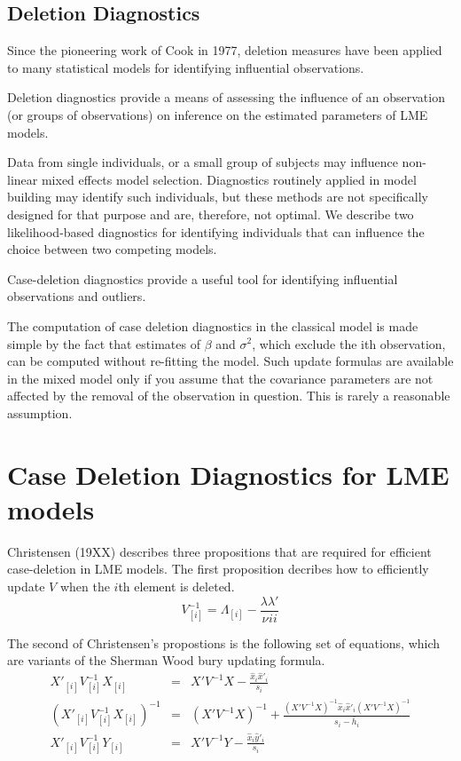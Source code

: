 \documentclass[MAIN.tex]{subfiles}
\begin{document}
\subsection{Deletion Diagnostics}

Since the pioneering work of Cook in 1977, deletion measures have been applied to many statistical models for identifying influential observations.

Deletion diagnostics provide a means of assessing the influence of an observation (or groups of observations) on inference on the estimated parameters of LME models.

Data from single individuals, or a small group of subjects may influence non-linear mixed effects model selection. Diagnostics routinely applied in model building may identify such individuals, but these methods are not specifically designed for that purpose and are, therefore, not optimal. We describe two likelihood-based diagnostics for identifying individuals that can influence the choice between two competing models.

Case-deletion diagnostics provide a useful tool for identifying influential observations and outliers.

The computation of case deletion diagnostics in the classical model is made simple by the fact that estimates of $\beta$ and $\sigma^2$, which exclude the ith observation, can be computed without re-fitting the model. Such update formulas are available in the mixed model only if you assume that the covariance parameters are not affected by the removal of the observation in question. This is rarely a reasonable assumption.

	\section{Case Deletion Diagnostics for LME models}
	
	
	Christensen (19XX)  describes three propositions that are required
	for efficient case-deletion in LME models. The first proposition
	decribes how to efficiently update $V$ when the $i$th element is
	deleted.
	\begin{equation}
	V_{[i]}^{-1} = \Lambda_{[i]} - \frac{\lambda
		\lambda\prime}{\nu^{}ii}
	\end{equation}
	
	
	The second of Christensen's propostions is the following set of
	equations, which are variants of the Sherman Wood bury updating
	formula.
	\begin{eqnarray}
	X'_{[i]}V_{[i]}^{-1}X_{[i]} &=& X' V^{-1}X -
	\frac{\hat{x}_{i}\hat{x}'_{i}}{s_{i}}\\
	(X'_{[i]}V_{[i]}^{-1}X_{[i]})^{-1} &=& (X' V^{-1}X)^{-1} +
	\frac{(X' V^{-1}X)^{-1}\hat{x}_{i}\hat{x}' _{i}
		(X' V^{-1}X)^{-1}}{s_{i}- \bar{h}_{i}}\\
	X'_{[i]}V_{[i]}^{-1}Y_{[i]} &=& X\prime V^{-1}Y -
	\frac{\hat{x}_{i}\hat{y}' _{i}}{s_{i}}
	\end{eqnarray}
	
\end{document}
